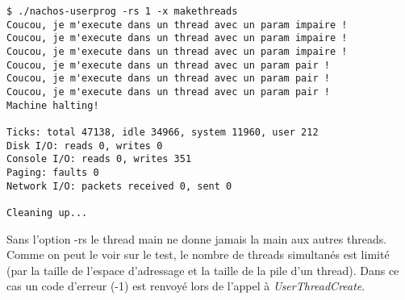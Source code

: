 \documentclass[a4paper,10pt]{article}
\begin{document}
\begin{lstlisting}
$ ./nachos-userprog -rs 1 -x makethreads
Coucou, je m'execute dans un thread avec un param impaire !
Coucou, je m'execute dans un thread avec un param impaire !
Coucou, je m'execute dans un thread avec un param impaire !
Coucou, je m'execute dans un thread avec un param pair !
Coucou, je m'execute dans un thread avec un param pair !
Coucou, je m'execute dans un thread avec un param pair !
Machine halting!

Ticks: total 47138, idle 34966, system 11960, user 212
Disk I/O: reads 0, writes 0
Console I/O: reads 0, writes 351
Paging: faults 0
Network I/O: packets received 0, sent 0

Cleaning up...
\end{lstlisting}

Sans l'option -rs le thread main ne donne jamais la main aux autres
threads. Comme on peut le voir sur le test, le nombre de threads simultanés
est limité (par la taille de l'espace d'adressage et la taille de la
pile d'un thread). Dans ce cas un code d'erreur (-1) est renvoyé lors de
l'appel à \textit{UserThreadCreate}.
\end{document}
